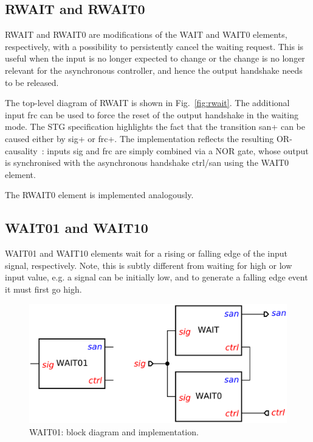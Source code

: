 \documentclass[conference]{IEEEtran}
\begin{document}
\subsection{\textsf{RWAIT} and \textsf{RWAIT0}}

\textsf{RWAIT} and \textsf{RWAIT0} are modifications of the \textsf{WAIT} and \textsf{WAIT0}
elements, respectively, with a possibility to persistently cancel the waiting request. This
is useful when the input is no longer expected to change or the change is no longer relevant
for the asynchronous controller, and hence the output handshake needs to be released.

The top-level diagram of \textsf{RWAIT} is shown in Fig.~\ref{fig:rwait}. The additional input
\textsf{frc} can be used to force the reset of the output handshake in the waiting mode. The
STG specification highlights the fact that the transition \textsf{san+} can be caused either by
\textsf{sig+} or \textsf{frc+}. The implementation reflects the resulting
OR-causality~\cite{1996_yakovlev_or}: inputs \textsf{sig} and \textsf{frc} are simply combined
via a NOR gate, whose output is synchronised with the asynchronous handshake \textsf{ctrl/san}
using the \textsf{WAIT0} element.

The \textsf{RWAIT0} element is implemented analogously.

\subsection{\textsf{WAIT01} and \textsf{WAIT10}}

\textsf{WAIT01} and \textsf{WAIT10} elements wait for a rising or falling edge of the input
signal, respectively. Note, this is subtly different from waiting for high or low input value,
e.g. a signal can be initially low, and to generate a falling edge event it must first go high.

\begin{figure}
\begin{center}
    \includegraphics[scale=0.23]{fig/WAIT01.pdf}
    \caption{\textsf{WAIT01}: block diagram and implementation.}
    \label{fig:wait01}
\end{center}
\end{figure}
\end{document}
